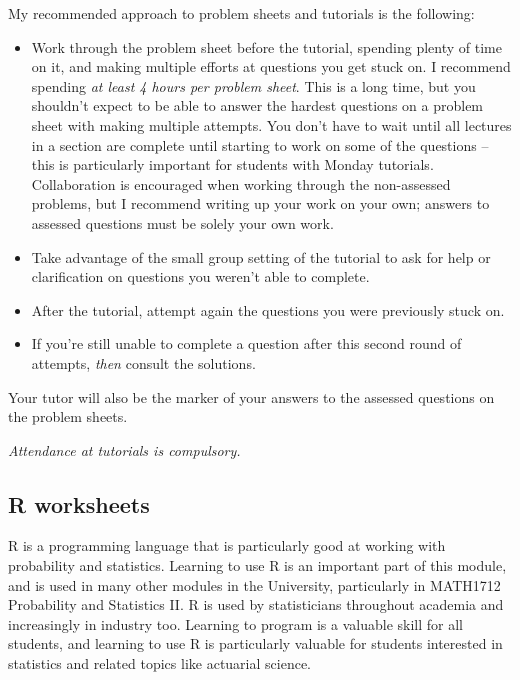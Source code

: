 \documentclass[
  letterpaper,
]{report}
\theoremstyle{definition}
\theoremstyle{definition}
\theoremstyle{remark}
\begin{document}
My recommended approach to problem sheets and tutorials is the
following:

\begin{itemize}
\item
  Work through the problem sheet before the tutorial, spending plenty of
  time on it, and making multiple efforts at questions you get stuck on.
  I recommend spending \emph{at least 4 hours per problem sheet}. This
  is a long time, but you shouldn't expect to be able to answer the
  hardest questions on a problem sheet with making multiple attempts.
  You don't have to wait until all lectures in a section are complete
  until starting to work on some of the questions -- this is
  particularly important for students with Monday tutorials.
  Collaboration is encouraged when working through the non-assessed
  problems, but I recommend writing up your work on your own; answers to
  assessed questions must be solely your own work.
\item
  Take advantage of the small group setting of the tutorial to ask for
  help or clarification on questions you weren't able to complete.
\item
  After the tutorial, attempt again the questions you were previously
  stuck on.
\item
  If you're still unable to complete a question after this second round
  of attempts, \emph{then} consult the solutions.
\end{itemize}

Your tutor will also be the marker of your answers to the assessed
questions on the problem sheets.

\emph{Attendance at tutorials is compulsory.}

\hypertarget{r-worksheets}{%
\subsection*{R worksheets}\label{r-worksheets}}

R is a programming language that is particularly good at working with
probability and statistics. Learning to use R is an important part of
this module, and is used in many other modules in the University,
particularly in MATH1712 Probability and Statistics II. R is used by
statisticians throughout academia and increasingly in industry too.
Learning to program is a valuable skill for all students, and learning
to use R is particularly valuable for students interested in statistics
and related topics like actuarial science.
\end{document}
